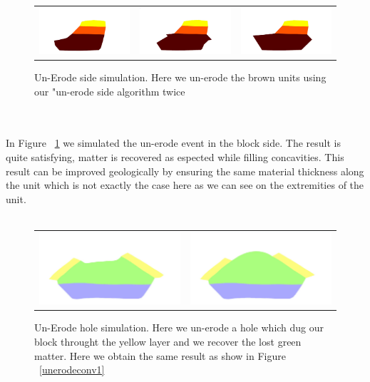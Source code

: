 \documentclass[12pt, a4paper]{report} %
\begin{document}
\begin{figure}[htb]
\centering
\begin{tabular}{@{}ccc@{}}
\includegraphics[width=.36\textwidth]{erodeSide0.png}&
\includegraphics[width=.36\textwidth]{erodeSide1.png}&
\includegraphics[width=.36\textwidth]{erodeSide2.png}\\
\end{tabular}
\caption{Un-Erode side simulation. Here we un-erode the brown units using our "un-erode side algorithm twice}
\label{erodeSide}
\end{figure}\\\\
In Figure ~\ref{erodeSide} we simulated the un-erode event in the block side. The result is quite satisfying, matter is recovered as espected while filling concavities. This result can be improved geologically by ensuring the same material thickness along the unit which is not exactly the case here as we can see on the extremities of the unit.\\\\
\begin{figure}[htb]
\centering
\begin{tabular}{@{}cc@{}}
\includegraphics[width=.49\textwidth]{unErodeGap0.png}&
\includegraphics[width=.49\textwidth]{unErodeGap1.png}\\
\end{tabular}
\caption{Un-Erode hole simulation. Here we un-erode a hole which dug our block throught the yellow layer and we recover the lost green matter. Here we obtain the same result as show in Figure ~\ref{unerodeconv1}}
\label{erodeGap}
\end{figure}
\end{document}
